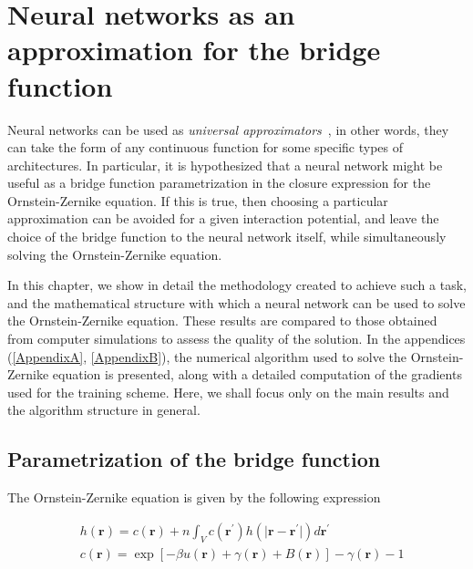 \newcommand{\vecr}{\mathbf{r}}
\newcommand{\veck}{\mathbf{k}}
\newcommand{\nnet}{N_{\theta}(\mathbf{r})}
\chapter{Neural networks as an approximation for the bridge function}
\label{Cap3}


Neural networks can be used as \emph{universal approximators}~\cite{hornikMultilayerFeedforwardNetworks1989, hornikApproximationCapabilitiesMultilayer1991, cybenkoApproximationSuperpositionsSigmoidal1989},
in other words, they can take the form of any continuous function for some specific
types of architectures.
In particular, it is hypothesized that a neural network might be useful as a bridge function
parametrization in the closure expression for the Ornstein-Zernike equation. If this is true,
then choosing a particular approximation can be avoided for a given interaction potential, 
and leave the choice of the bridge function to the neural network itself, while
simultaneously solving the Ornstein-Zernike equation.

In this chapter, we show in detail the methodology created to achieve such a task, and
the mathematical structure with which a neural network can be used to solve the
Ornstein-Zernike equation.
These results are compared to those obtained from computer simulations to assess the
quality of the solution.
In the appendices (\autoref{AppendixA}, \autoref{AppendixB}), the numerical algorithm used 
to solve the Ornstein-Zernike equation
is presented, along with a detailed computation of the gradients used for the
training scheme. Here, we shall focus only on the main results and the algorithm structure
in general.

\section{Parametrization of the bridge function}

The Ornstein-Zernike equation is given by the following expression

\begin{subequations}
    \begin{align*}
         & h(\vecr) = c(\vecr) +
        n \int_{V}
        c(\vecr^{\prime})
        h(\lvert \vecr - \vecr^{\prime} \rvert)
        d\vecr^{\prime} \label{eq:oz1} \\
         & c(\vecr)
        = \exp{\left[
                -  \beta u(\vecr)
                +  \gamma(\vecr)
                + B(\vecr)
                \right]} -
        \gamma(\vecr)
        - 1
    \end{align*}
\end{subequations}


